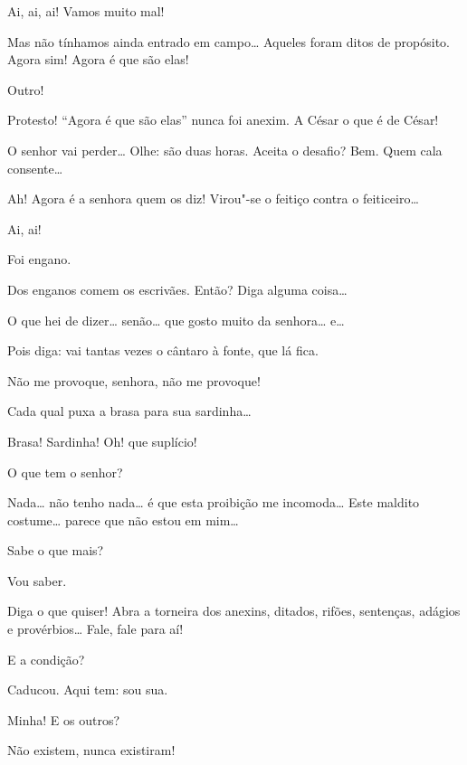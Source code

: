\begin{linenumbers}
  Ai, ai, ai! Vamos muito mal!

  Mas não tínhamos ainda entrado em campo\ldots{} Aqueles foram
ditos de propósito. Agora sim! Agora é que são elas!

  Outro!

  Protesto! “Agora é que são elas” nunca foi anexim. A César o que
é de César!

  O senhor vai perder\ldots{} Olhe: são duas horas.  Aceita o desafio?  Bem. Quem
cala consente\ldots{}

  Ah! Agora é a senhora quem os diz! Virou"-se o feitiço contra o
feiticeiro\ldots{}

  Ai, ai!

  Foi engano.

  Dos enganos comem os escrivães.  Então?  Diga alguma
coisa\ldots{}

  O que hei de dizer\ldots{} senão\ldots{} que gosto muito da
senhora\ldots{} e\ldots{}

  Pois diga: vai tantas vezes o cântaro à fonte, que lá fica.

  Não me provoque, senhora, não me provoque!

  Cada qual puxa a brasa para sua sardinha\ldots{}

   Brasa! Sardinha! Oh! que suplício!

  O que tem o senhor?

  Nada\ldots{} não tenho nada\ldots{} é que esta proibição me
incomoda\ldots{} Este maldito costume\ldots{} parece que não estou em mim\ldots{}

  Sabe o que mais?

  Vou saber.

  Diga o que quiser! Abra a torneira dos anexins, ditados,
rifões, sentenças, adágios e provérbios\ldots{} Fale, fale para aí!

  E a condição?

  Caducou.  Aqui tem: sou sua.

   Minha!  E os outros?

  Não existem, nunca existiram!


\end{linenumbers}
